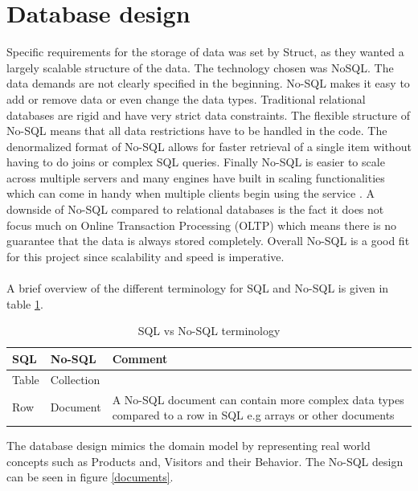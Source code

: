 \section{Database design}
Specific requirements for the storage of data was set by Struct, as they wanted a largely scalable structure of the data. The technology chosen was \gls{NoSQL}.
The data demands are not clearly specified in the beginning. No-SQL makes it easy to add or remove data or even change the data types. Traditional relational databases are rigid and have very strict data constraints. The flexible structure of No-SQL means that all data restrictions have to be handled in the code. The denormalized format of No-SQL allows for faster retrieval of a single item without having to do joins or complex SQL queries. Finally No-SQL is easier to scale across multiple servers and many engines have built in scaling functionalities which can come in handy when multiple clients begin using the service \cite{SQLvsNOSQL}. A downside of No-SQL compared to relational databases is the fact it does not focus much on Online Transaction Processing (OLTP) which means there is no guarantee that the data is always stored completely. Overall No-SQL is a good fit for this project since scalability and speed is imperative. \\\\

A brief overview of the different terminology for SQL and No-SQL is given in table \ref{sqlvsnosql_table}.
\begin{table}[H]
	\centering
	\caption{SQL vs No-SQL terminology}
	\label{sqlvsnosql_table}
	\begin{tabular}{|l|l|p{8cm}|}
		\hline
		\textbf{SQL}   & \textbf{No-SQL}     & \textbf{Comment}                                                                                                    \\ \hline
		Table & Collection &                                                                                                            \\ \hline
		Row   & Document   & A No-SQL document can contain more complex data types compared to a row in SQL e.g arrays or other documents \\
		\hline
	\end{tabular}
\end{table}

The database design mimics the domain model by representing real world concepts such as Products and, Visitors and their Behavior. The No-SQL design can be seen in figure \ref{documents}.

